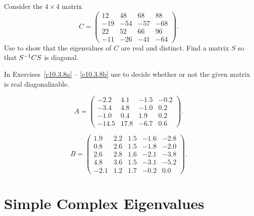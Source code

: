 \documentclass{ximera}
\begin{document}
\CEXER

\begin{exercise} \label{c10.3.7}
Consider the $4\times 4$ matrix
\begin{equation*}
C =\left(\begin{array}{rrrr}  12 & 48 & 68 & 88 \\ -19 & -54 & -57 & -68\\
22 & 52 & 66 & 96 \\ -11 & -26 & -41 & -64 \end{array}\right).
\end{equation*}
Use \Matlab to show that the eigenvalues of $C$ are real and distinct.
Find a matrix $S$ so that $S^{-1} CS$ is diagonal.  
\end{exercise}

\noindent In Exercises~\ref{c10.3.8a} -- \ref{c10.3.8b} use \Matlab 
to decide whether or not the given matrix is real diagonalizable.
\begin{exercise} \label{c10.3.8a}
\begin{equation*}
A=\left(
\begin{array}{rrrr}
      -2.2 & 4.1&-1.5&-0.2\\
      -3.4 & 4.8&-1.0& 0.2\\
      -1.0 & 0.4& 1.9& 0.2\\
     -14.5 &17.8&-6.7& 0.6
\end{array}
\right).
\end{equation*}
\end{exercise}
\begin{exercise} \label{c10.3.8b}
\begin{equation*}
B=\left(
\begin{array}{rrrrr}
      1.9 & 2.2 & 1.5 & -1.6 & -2.8\\
      0.8 & 2.6 & 1.5 & -1.8 & -2.0\\
      2.6 & 2.8 & 1.6 & -2.1 & -3.8\\
      4.8 & 3.6 & 1.5 & -3.1 & -5.2\\
     -2.1 & 1.2 & 1.7 & -0.2 &  0.0
\end{array} \right).
\end{equation*}
\end{exercise}



\section{Simple Complex Eigenvalues}  \label{S:CSE}
\end{document}
